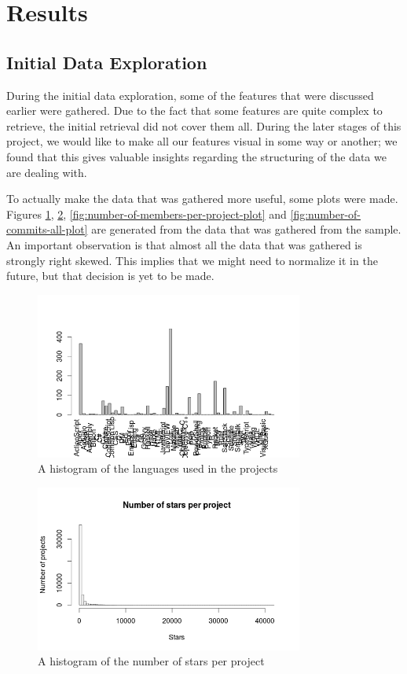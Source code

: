 \section{Results}
    \subsection{Initial Data Exploration}
        During the initial data exploration, some of the features that were discussed earlier were gathered. Due to the fact that some features are quite complex to retrieve, the initial retrieval did not cover them all. During the later stages of this project, we would like to make all our features visual in some way or another; we found that this gives valuable insights regarding the structuring of the data we are dealing with.
        
        To actually make the data that was gathered more useful, some plots were made. 
        Figures \ref{fig:language-frequency-plot}, \ref{fig:star-distribution-plot}, \ref{fig:number-of-members-per-project-plot} and \ref{fig:number-of-commits-all-plot} are generated from the data that was gathered from the sample.
        An important observation is that almost all the data that was gathered is strongly right skewed. %
        This implies that we might need to normalize it in the future, but that decision is yet to be made. 
        
	    \begin{figure}
	        \includegraphics[width=250pt]{figures/language-frequency}
	        \caption{A histogram of the languages used in the projects}
	        \label{fig:language-frequency-plot}
	    \end{figure}

	    
	    \begin{figure}
	        \includegraphics[width=250pt]{figures/star-distribution}
	        \caption{A histogram of the  number of stars per project}
	        \label{fig:star-distribution-plot}
	    \end{figure}
	    
